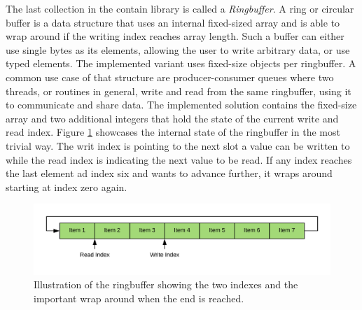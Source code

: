 The last collection in the contain library is called a \textit{Ringbuffer}. A ring or circular buffer is a data structure that uses an internal fixed-sized array and is able to wrap around if the writing index reaches array length. Such a buffer can either use single bytes as its elements, allowing the user to write arbitrary data, or use typed elements. The implemented variant uses fixed-size objects per ringbuffer. A common use case of that structure are producer-consumer queues where two threads, or routines in general, write and read from the same ringbuffer, using it to communicate and share data. The implemented solution contains the fixed-size array and two additional integers that hold the state of the current write and read index. Figure \ref{fig:ringbuffer} showcases the internal state of the ringbuffer in the most trivial way. The writ index is pointing to the next slot a value can be written to while the read index is indicating the next value to be read. If any index reaches the last element ad index six and wants to advance further, it wraps around starting at index zero again.

\begin{figure}[h!]
	\centering \includegraphics[width=\linewidth]{PICs/ringbuffer.png}
	\caption{Illustration of the ringbuffer showing the two indexes and the important wrap around when the end is reached.}
	\label{fig:ringbuffer}
\end{figure}


